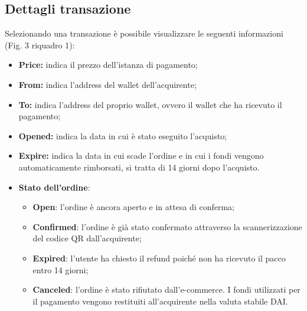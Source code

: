 \documentclass[a4paper, 12pt]{article}
\begin{document}
\subsection{Dettagli transazione}
Selezionando una transazione è possibile visualizzare le seguenti informazioni (Fig. 3 riquadro 1):
\begin{itemize}
  \item \textbf{Price:} indica il prezzo dell'istanza di pagamento;
  \item \textbf{From:} indica l'address del wallet dell'acquirente;
  \item \textbf{To:} indica l'address del proprio wallet, ovvero il wallet che ha ricevuto il pagamento;
  \item \textbf{Opened:} indica la data in cui è stato eseguito l'acquisto;
  \item \textbf{Expire:} indica la data in cui scade l'ordine e in cui i fondi vengono automaticamente rimborsati, si tratta di 14 giorni dopo l'acquisto.
  \item \textbf{Stato dell'ordine}:
  \begin{itemize}
    \item \textbf{Open}: l'ordine è ancora aperto e in attesa di conferma;
    \item \textbf{Confirmed}: l'ordine è già stato confermato attraverso la scannerizzazione del codice QR dall'acquirente;
    \item \textbf{Expired}: l'utente ha chiesto il refund poiché non ha ricevuto il pacco entro 14 giorni;
    \item \textbf{Canceled}: l'ordine è stato rifiutato dall'e-commerce. I fondi utilizzati per il pagamento vengono restituiti all'acquirente nella valuta stabile DAI.
  \end{itemize}
\end{itemize}
\end{document}
